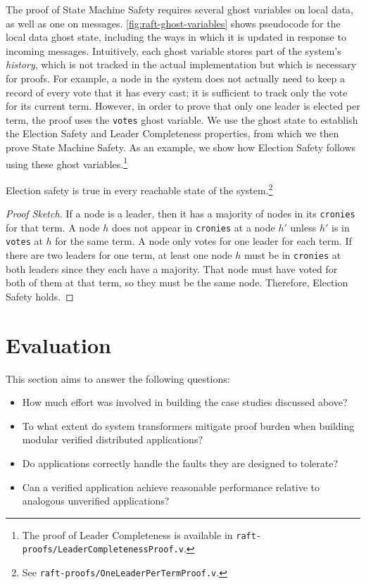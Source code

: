 The proof of State Machine Safety requires several ghost variables on
local data, as well as one on messages. \cref{fig:raft-ghost-variables} shows
pseudocode for the local data ghost state, including the ways in which
it is updated in response to incoming messages. Intuitively, each
ghost variable stores part of the system's \textit{history}, which is
not tracked in the actual implementation but which is necessary for
proofs. For example, a node in the system does not actually need to
keep a record of every vote that it has every cast; it is sufficient
to track only the vote for its current term. However, in order to
prove that only one leader is elected per term, the proof uses the
\texttt{votes} ghost variable.  We use the ghost state to establish
the Election Safety and Leader Completeness properties, from which we
then prove State Machine Safety. As an example, we show how Election
Safety follows using these ghost variables.\footnote{The proof of Leader
Completeness is available in \texttt{raft-proofs/\allowbreak LeaderCompletenessProof.v}.}

\begin{theorem}
  Election safety is true in every reachable state of the
  system.\footnote{See \texttt{raft-proofs/OneLeaderPerTermProof.v}.}
\end{theorem}
\begin{proof}[Proof Sketch]
  If a node is a leader, then it has a majority of nodes in its
  \texttt{cronies} for that term. A node $h$ does not appear in
  \texttt{cronies} at a node $h'$ unless $h'$ is in \texttt{votes} at
  $h$ for the same term. A node only votes for one leader for each
  term. If there are two leaders for one term, at least one node $h$
  must be in \texttt{cronies} at both leaders since they each have a
  majority. That node must have voted for both of them at that term,
  so they must be the same node. Therefore, Election Safety holds.
\end{proof}

\section{Evaluation}
\label{sec:verdi:eval}

This section aims to answer the following questions:
\begin{itemize}%
\item How much effort was involved in building the case studies discussed above?
\item To what extent do system transformers mitigate proof burden when
  building modular verified distributed applications?
\item Do \Verdi applications correctly handle the faults they are designed to tolerate?
\item Can a verified \Verdi application achieve reasonable performance
  relative to analogous unverified applications?
\end{itemize}

